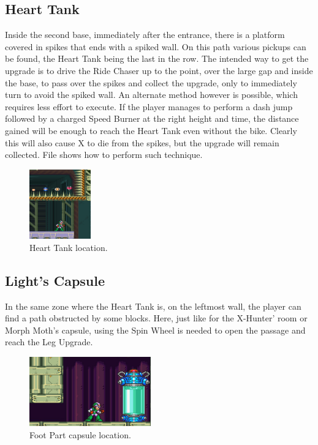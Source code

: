 \subsection{Heart Tank}
Inside the second base, immediately after the entrance, there is a platform covered in spikes that ends with a spiked wall. On this path various pickups can be found, the Heart Tank being the last in the row. The intended way to get the upgrade is to drive the Ride Chaser up to the point, over the large gap and inside the base, to pass over the spikes and collect the upgrade, only to immediately turn to avoid the spiked wall. An alternate method however is possible, which requires less effort to execute. If the player manages to perform a dash jump followed by a charged Speed Burner at the right height and time, the distance gained will be enough to reach the Heart Tank even without the bike. Clearly this will also cause X to die from the spikes, but the upgrade will remain collected. File  shows how to perform such technique.
\begin{figure}[htp]
	\centering
	\includegraphics[height=3cm]{figures/X2/Overdrive_ostrich/Ostrich_heart.png}
	\caption{Heart Tank location.}
\end{figure}

\subsection{Light's Capsule}\label{X2:Foot_parts}
In the same zone where the Heart Tank is, on the leftmost wall, the player can find a path obstructed by some blocks. Here, just like for the X-Hunter' room or Morph Moth's capsule, using the Spin Wheel is needed to open the passage and reach the Leg Upgrade.
\begin{figure}[htp]
	\centering
	\includegraphics[height=3cm]{figures/X2/Overdrive_ostrich/Ostrich_capsule.jpg}
	\caption{Foot Part capsule location.}
\end{figure}

